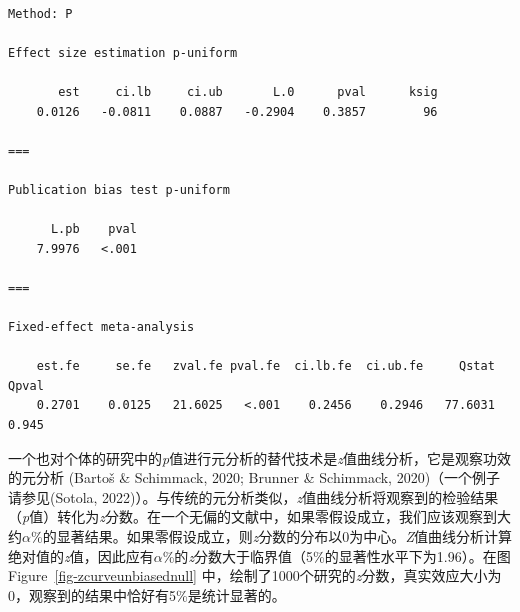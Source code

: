 \documentclass[
  letterpaper,
  DIV=11,
  numbers=noendperiod]{scrreprt}
\newenvironment{Shaded}{\begin{snugshade}}{\end{snugshade}}
\newcommand{\AttributeTok}[1]{\textcolor[rgb]{0.40,0.45,0.13}{#1}}
\newcommand{\FunctionTok}[1]{\textcolor[rgb]{0.28,0.35,0.67}{#1}}
\newcommand{\NormalTok}[1]{\textcolor[rgb]{0.00,0.23,0.31}{#1}}
\newcommand{\SpecialCharTok}[1]{\textcolor[rgb]{0.37,0.37,0.37}{#1}}
\newcommand{\StringTok}[1]{\textcolor[rgb]{0.13,0.47,0.30}{#1}}
\begin{document}
\begin{Shaded}
\end{Shaded}

\begin{verbatim}

Method: P

Effect size estimation p-uniform

       est     ci.lb     ci.ub       L.0      pval      ksig
    0.0126   -0.0811    0.0887   -0.2904    0.3857        96

===

Publication bias test p-uniform

      L.pb    pval
    7.9976   <.001

===

Fixed-effect meta-analysis

    est.fe     se.fe   zval.fe pval.fe  ci.lb.fe  ci.ub.fe     Qstat     Qpval
    0.2701    0.0125   21.6025   <.001    0.2456    0.2946   77.6031     0.945
\end{verbatim}

一个也对个体的研究中的\emph{p}值进行元分析的替代技术是\emph{z}值曲线分析，它是观察功效的元分析
(Bartoš \& Schimmack, 2020; Brunner \& Schimmack,
2020)（一个例子请参见(Sotola,
2022)）。与传统的元分析类似，\emph{z}值曲线分析将观察到的检验结果（\emph{p}值）转化为\emph{z}分数。在一个无偏的文献中，如果零假设成立，我们应该观察到大约\(\alpha\)\%的显著结果。如果零假设成立，则\emph{z}分数的分布以0为中心。\emph{Z}值曲线分析计算绝对值的\emph{z}值，因此应有\(\alpha\)\%的\emph{z}分数大于临界值（5\%的显著性水平下为1.96）。在图
Figure~\ref{fig-zcurveunbiasednull}
中，绘制了1000个研究的\emph{z}分数，真实效应大小为0，观察到的结果中恰好有5\%是统计显著的。
\end{document}
